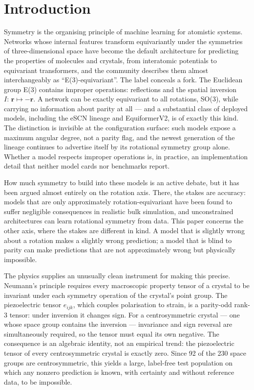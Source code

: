 \section*{Introduction}

Symmetry is the organising principle of machine learning for atomistic systems. Networks whose internal features transform equivariantly under the symmetries of three-dimensional space have become the default architecture for predicting the properties of molecules and crystals, from interatomic potentials\cite{batzner2022nequip,musaelian2023allegro,batatia2022mace} to equivariant transformers\cite{liao2023equiformer,liao2024equiformerv2}, and the community describes them almost interchangeably as ``E(3)-equivariant''. The label conceals a fork. The Euclidean group E(3) contains improper operations: reflections and the spatial inversion $I\colon\, \mathbf{r} \mapsto -\mathbf{r}$. A network can be exactly equivariant to all rotations, SO(3), while carrying no information about parity at all --- and a substantial class of deployed models, including the eSCN lineage\cite{passaro2023escn} and EquiformerV2, is of exactly this kind. The distinction is invisible at the configuration surface: such models expose a maximum angular degree, not a parity flag, and the newest generation of the lineage continues to advertise itself by its rotational symmetry group alone\cite{equiformerv3}. Whether a model respects improper operations is, in practice, an implementation detail that neither model cards nor benchmarks report.

How much symmetry to build into these models is an active debate, but it has been argued almost entirely on the rotation axis. There, the stakes are accuracy: models that are only approximately rotation-equivariant have been found to suffer negligible consequences in realistic bulk simulation\cite{langer2024broken}, and unconstrained architectures can learn rotational symmetry from data. This paper concerns the other axis, where the stakes are different in kind. A model that is slightly wrong about a rotation makes a slightly wrong prediction; a model that is blind to parity can make predictions that are not approximately wrong but physically impossible.

The physics supplies an unusually clean instrument for making this precise. Neumann's principle\cite{nye1985crystals} requires every macroscopic property tensor of a crystal to be invariant under each symmetry operation of the crystal's point group. The piezoelectric tensor $e_{ijk}$, which couples polarisation to strain, is a parity-odd rank-3 tensor: under inversion it changes sign. For a centrosymmetric crystal --- one whose space group contains the inversion --- invariance and sign reversal are simultaneously required, so the tensor must equal its own negative. The consequence is an algebraic identity, not an empirical trend: the piezoelectric tensor of every centrosymmetric crystal is exactly zero. Since 92 of the 230 space groups are centrosymmetric, this yields a large, label-free test population on which any nonzero prediction is known, with certainty and without reference data, to be impossible.

